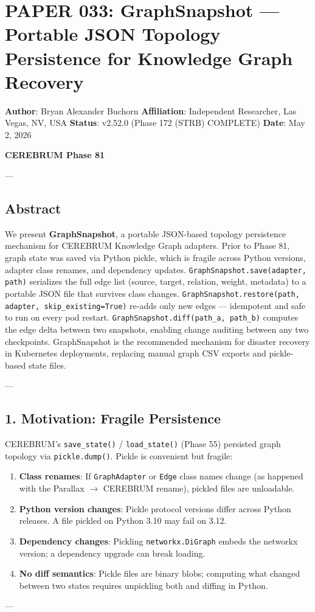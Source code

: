 \section{PAPER 033: GraphSnapshot — Portable JSON Topology Persistence for Knowledge Graph Recovery}

\textbf{Author}: Bryan Alexander Buchorn  
\textbf{Affiliation}: Independent Researcher, Las Vegas, NV, USA  
\textbf{Status}: v2.52.0 (Phase 172 (STRB) COMPLETE)
\textbf{Date}: May 2, 2026

\textbf{CEREBRUM Phase 81}

---

\subsection{Abstract}

We present \textbf{GraphSnapshot}, a portable JSON-based topology persistence mechanism for CEREBRUM Knowledge Graph adapters. Prior to Phase 81, graph state was saved via Python pickle, which is fragile across Python versions, adapter class renames, and dependency updates. \texttt{GraphSnapshot.save(adapter, path)} serializes the full edge list (source, target, relation, weight, metadata) to a portable JSON file that survives class changes. \texttt{GraphSnapshot.restore(path, adapter, skip\_existing=True)} re-adds only new edges — idempotent and safe to run on every pod restart. \texttt{GraphSnapshot.diff(path\_a, path\_b)} computes the edge delta between two snapshots, enabling change auditing between any two checkpoints. GraphSnapshot is the recommended mechanism for disaster recovery in Kubernetes deployments, replacing manual graph CSV exports and pickle-based state files.

---

\subsection{1. Motivation: Fragile Persistence}

CEREBRUM's \texttt{save\_state()} / \texttt{load\_state()} (Phase 55) persisted graph topology via \texttt{pickle.dump()}. Pickle is convenient but fragile:

\begin{enumerate}
\item \textbf{Class renames}: If \texttt{GraphAdapter} or \texttt{Edge} class names change (as happened with the Parallax $\to$ CEREBRUM rename), pickled files are unloadable.
\item \textbf{Python version changes}: Pickle protocol versions differ across Python releases. A file pickled on Python 3.10 may fail on 3.12.
\item \textbf{Dependency changes}: Pickling \texttt{networkx.DiGraph} embeds the networkx version; a dependency upgrade can break loading.
\item \textbf{No diff semantics}: Pickle files are binary blobs; computing what changed between two states requires unpickling both and diffing in Python.

\end{enumerate}
---

